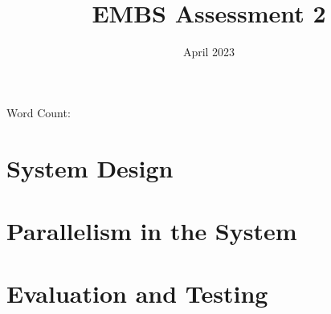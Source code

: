 \documentclass[11pt]{article}
\title{EMBS Assessment 2}
\author{}
\date{April 2023}
\begin{document}
\begin{titlepage}
\maketitle
Word Count: 
\tableofcontents
\end{titlepage}

\section{System Design}

\newpage
\section{Parallelism in the System}

\newpage
\section{Evaluation and Testing}

\printglossary
\printglossary[type=\acronymtype]
\end{document}
